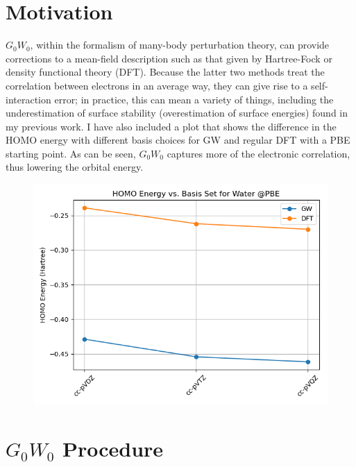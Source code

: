 \documentclass[12pt]{caltech_thesis}
\begin{document}
\chapter{Motivation}
$G_0W_0$, within the formalism of many-body perturbation theory, can provide corrections to a mean-field description such as that given by Hartree-Fock or density functional theory (DFT). Because the latter two methods treat the correlation between electrons in an average way, they can give rise to a self-interaction error; in practice, this can mean a variety of things, including the underestimation of surface stability (overestimation of surface energies) found in my previous work. \autocite{curj_elucidating_2021} I have also included a plot that shows the difference in the HOMO energy with different basis choices for GW and regular DFT with a PBE starting point. As can be seen, $G_0W_0$ captures more of the electronic correlation, thus lowering the orbital energy.
\begin{figure}[h]
    \centering
    \includegraphics[width=\textwidth]{water_gw.png}
\end{figure}


\chapter{$G_0W_0$ Procedure}
\end{document}
